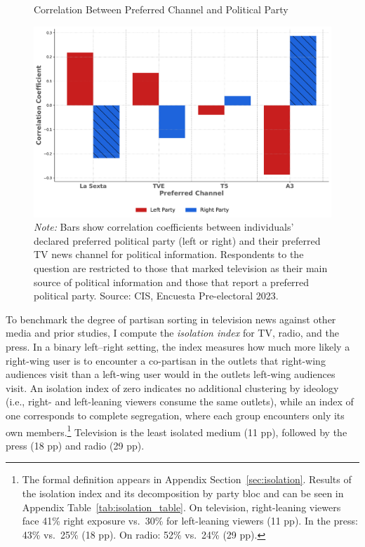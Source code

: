 \documentclass[12pt]{article}
\begin{document}
	
	\begin{figure}[!htbp]
		\centering
		\caption{Correlation Between Preferred Channel and Political Party}
		\includegraphics[width=120mm]{figures/corr_party_channel3}
		\caption*{\small \textit{Note:} Bars show correlation coefficients between individuals’ declared preferred political party (left or right) and their preferred TV news channel for political information. Respondents to the question are restricted to those that marked television as their main source of political information and those that report a preferred political party. Source: CIS, Encuesta Pre-electoral 2023.}
		\label{fig:opinion}
	\end{figure}
	
	

	
	
	
	To benchmark the degree of partisan sorting in television news against other media and prior studies, I compute the \emph{isolation index} \citep{gentzkow_isolation} for TV, radio, and the press. In a binary left–right setting, the index measures how much more likely a right-wing user is to encounter a co-partisan in the outlets that right-wing audiences visit than a left-wing user would in the outlets left-wing audiences visit. An isolation index of zero indicates no additional clustering by ideology (i.e., right- and left-leaning viewers consume the same outlets), while an index of one corresponds to complete segregation, where each group encounters only its own members.\footnote{The formal definition appears in Appendix  Section~\ref{sec:isolation}. Results of the isolation index and its decomposition by party bloc and can be seen in  Appendix Table~\ref{tab:isolation_table}. On television, right-leaning viewers face 41\% right exposure vs.\ 30\% for left-leaning viewers (11 pp). In the press: 43\% vs.\ 25\% (18 pp). On radio: 52\% vs.\ 24\% (29 pp).} Television is the least isolated medium (11 pp), followed by the press (18 pp) and radio (29 pp).
	
\end{document}
